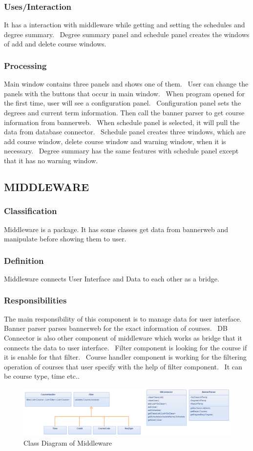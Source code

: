 \documentclass[twoside,letterpaper]{article}
\begin{document}
\subsubsection{Uses/Interaction}
It has a interaction with middleware while getting and setting the schedules and degree summary. \ Degree summary panel and schedule panel creates the windows of add and delete course windows.
\subsubsection{Processing}
Main window contains three panels and shows one of them. \ User can change the panels with the buttons that occur in main window. \ When program opened for the first time, user will see a configuration panel. \ Configuration panel sets the degrees and current term information. Then call the banner parser to get course information from bannerweb. \ When schedule panel is selected, it will pull the data from database connector. \ Schedule panel creates three windows, which are add course window, delete course window and warning window, when it is necessary. \  Degree summary has the same features with schedule panel except that it has no warning window.
\subsection{MIDDLEWARE}
\subsubsection{Classification}
Middleware is a package. It has some classes get data from bannerweb and manipulate before showing them to user.
\subsubsection{Definition}
Middleware connects User Interface and Data to each other as a bridge.
\subsubsection{Responsibilities}
The main responsibility of this component is to manage data for user interface. Banner parser parses  bannerweb for the exact information of courses. \ DB Connector is also other component of middleware which works as bridge that it connects the data to user interface. \ Filter component is looking for the course if it is enable for that filter. \ Course handler component is working for the filtering operation of courses that user specify with the help of filter component. \ It can be course type, time etc..
\begin{figure}[h]
\centering
\includegraphics[width=\linewidth]{middleware.png}
\caption{Class Diagram of Middleware}
\end{figure}
\end{document}
